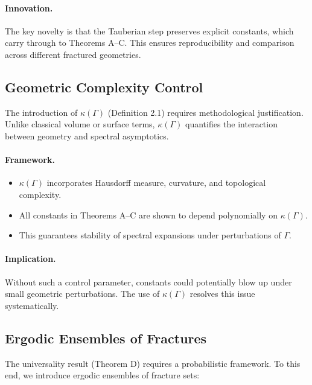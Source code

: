 \paragraph{Innovation.}
The key novelty is that the Tauberian step preserves explicit constants, which
carry through to Theorems A--C. This ensures reproducibility and comparison
across different fractured geometries.

\subsection{Geometric Complexity Control}

The introduction of $\kappa(\Gamma)$ (Definition 2.1) requires methodological
justification. Unlike classical volume or surface terms, $\kappa(\Gamma)$
quantifies the interaction between geometry and spectral asymptotics.

\paragraph{Framework.}
\begin{itemize}
  \item $\kappa(\Gamma)$ incorporates Hausdorff measure, curvature, and
  topological complexity.
  \item All constants in Theorems A--C are shown to depend polynomially on
  $\kappa(\Gamma)$.
  \item This guarantees stability of spectral expansions under perturbations of
  $\Gamma$.
\end{itemize}

\paragraph{Implication.}
Without such a control parameter, constants could potentially blow up under
small geometric perturbations. The use of $\kappa(\Gamma)$ resolves this issue
systematically.

\subsection{Ergodic Ensembles of Fractures}

The universality result (Theorem D) requires a probabilistic framework. To this
end, we introduce ergodic ensembles of fracture sets:

